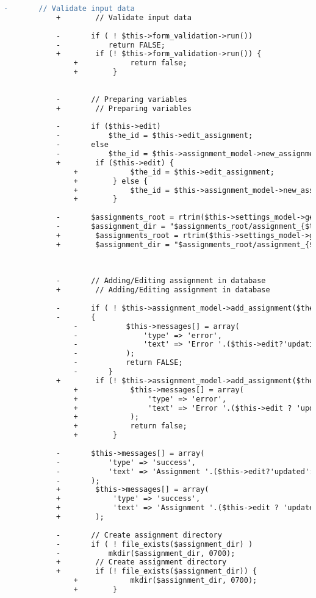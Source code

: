 \begin{lstlisting}[language=diff, caption=Perubahan pada kode Assignments.php]
			-		// Validate input data
			+        // Validate input data
			
			-		if ( ! $this->form_validation->run())
			-			return FALSE;
			+        if (! $this->form_validation->run()) {
				+            return false;
				+        }
			
			
			-		// Preparing variables
			+        // Preparing variables
			
			-		if ($this->edit)
			-			$the_id = $this->edit_assignment;
			-		else
			-			$the_id = $this->assignment_model->new_assignment_id();
			+        if ($this->edit) {
				+            $the_id = $this->edit_assignment;
				+        } else {
				+            $the_id = $this->assignment_model->new_assignment_id();
				+        }
			
			-		$assignments_root = rtrim($this->settings_model->get_setting('assignments_root'), '/');
			-		$assignment_dir = "$assignments_root/assignment_{$the_id}";
			+        $assignments_root = rtrim($this->settings_model->get_setting('assignments_root'), '/');
			+        $assignment_dir = "$assignments_root/assignment_{$the_id}";
			
			
			
			-		// Adding/Editing assignment in database
			+        // Adding/Editing assignment in database
			
			-		if ( ! $this->assignment_model->add_assignment($the_id, $this->edit))
			-		{
				-			$this->messages[] = array(
				-				'type' => 'error',
				-				'text' => 'Error '.($this->edit?'updating':'adding').' assignment.'
				-			);
				-			return FALSE;
				-		}
			+        if (! $this->assignment_model->add_assignment($the_id, $this->edit)) {
				+            $this->messages[] = array(
				+                'type' => 'error',
				+                'text' => 'Error '.($this->edit ? 'updating' : 'adding').' assignment.'
				+            );
				+            return false;
				+        }
			
			-		$this->messages[] = array(
			-			'type' => 'success',
			-			'text' => 'Assignment '.($this->edit?'updated':'added').' successfully.'
			-		);
			+        $this->messages[] = array(
			+            'type' => 'success',
			+            'text' => 'Assignment '.($this->edit ? 'updated' : 'added').' successfully.'
			+        );
			
			-		// Create assignment directory
			-		if ( ! file_exists($assignment_dir) )
			-			mkdir($assignment_dir, 0700);
			+        // Create assignment directory
			+        if (! file_exists($assignment_dir)) {
				+            mkdir($assignment_dir, 0700);
				+        }
			

\end{lstlisting}
